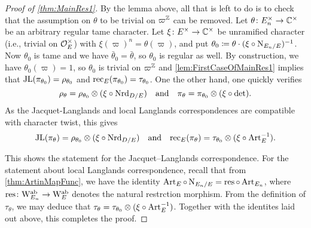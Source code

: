 \documentclass[../main.tex]{subfiles}
\begin{document}
\begin{proof}[Proof of \cref{thm:MainRes1}]
  By the lemma above, all that is left to do is to check that the 
  assumption on $\theta$ to be trivial on $\varpi^{\mathbb{Z}}$ can be removed.   
  Let $\theta\colon E_n^\times \to \mathbb{C}^\times$ be an arbitrary regular
  tame character. Let $\xi\colon E^\times \to \mathbb{C}^\times$ be unramified character 
  (i.e., trivial on $\mathcal{O}_E^\times$) with $\xi(\varpi)^n = \theta(\varpi)$, and
  put $\theta_0 \coloneqq \theta \cdot (\xi \circ \operatorname{N}_{E_n/E})^{-1}$. Now
  $\theta_0$ is tame and we have $\bar \theta_0 = \bar \theta$, so $\theta_0$
  is regular as well. By construction, we have $\theta_0(\varpi) = 1$, so
  $\theta_0$ is trivial on $\varpi^{\mathbb{Z}}$ and \cref{lem:FirstCaseOfMainRes1}
  implies that $\mathrm{JL}(\pi_{\theta_0}) = \rho_{\theta_0}$ and
  $\mathrm{rec}_E(\pi_{\theta_0}) = \tau_{\theta_0}$. 
  One the other hand, one quickly verifies
  \begin{equation*}
    \rho_{\theta} = \rho_{\theta_0} \otimes (\xi \circ \operatorname{Nrd}_{D/E}) 
      \quad \text{and} \quad
    \pi_{\theta} = \pi_{\theta_0} \otimes (\xi \circ \det).
  \end{equation*}
  As the Jacquet-Langlands and local Langlands correspondences are compatible
  with character twist, this gives
  \begin{equation*}
    \mathrm{JL}(\pi_\theta) = \rho_{\theta_0} \otimes (\xi \circ \operatorname{Nrd}_{D/E}) 
    \quad \text{and} \quad
    \mathrm{rec}_E(\pi_{\theta}) = \tau_{\theta_0} \otimes (\xi \circ \operatorname{Art}_E^{-1}).
  \end{equation*}

  This shows the statement for the Jacquet--Langlands correspondence. For the
  statement about local Langlands correspondence, recall that from 
  \cref{thm:ArtinMapFunc}, we have the identity
  $\operatorname{Art}_{E} \circ \operatorname{N}_{E_n/E} = \operatorname{res} \circ \operatorname{Art}_{E_n}$, where
  $\mathrm{res} \colon \mathrm W_{E_n}^{\mathrm{ab}} \to \mathrm W_E^{\mathrm{ab}}$ denotes the natural
  restrction morphism. 
  From the definition of $\tau_\theta$, we may deduce that 
  $\tau_{\theta} = \tau_{\theta_0} \otimes (\xi \circ \operatorname{Art}_E^{-1})$. 
  Together with the identites laid out above, this completes the proof.
\end{proof}

\end{document}
